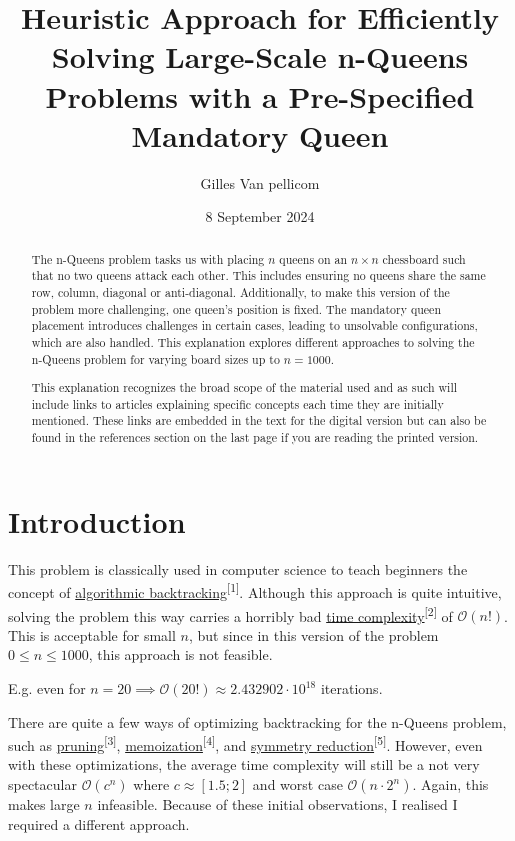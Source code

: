 \documentclass{article}
\title{Heuristic Approach for Efficiently Solving Large-Scale n-Queens Problems with a Pre-Specified Mandatory Queen}
\author{Gilles Van pellicom}
\date{8 September 2024}
\begin{document}
\maketitle

\begin{abstract}
    \setlength{\parindent}{0pt}
    \setlength{\parskip}{1em}
    The n-Queens problem tasks us with placing \(n\) queens on an \(n \times n\) chessboard such that no two queens attack each other.
    This includes ensuring no queens share the same row, column, diagonal or anti-diagonal. Additionally, to make this version of the problem more challenging,
    one queen's position is fixed.
    The mandatory queen placement introduces challenges in certain cases, leading to unsolvable configurations, which are also handled.
    This explanation explores different approaches to solving the n-Queens problem for varying board sizes up to \(n = 1000\).

    This explanation recognizes the broad scope of the material used and as such will include links to articles explaining specific concepts
    each time they are initially mentioned.
    These links are embedded in the text for the digital version but can also be found in the references section on the last page if you are reading the printed version.
\end{abstract}

\clearpage

{
    \hypersetup{linkcolor=black}
    \tableofcontents
}

\clearpage

\section{Introduction}
This problem is classically used in computer science to teach beginners the concept of
\href{https://en.wikipedia.org/wiki/Backtracking}{algorithmic backtracking}\textsuperscript{[1]}.
Although this approach is quite intuitive, solving the problem this way carries a horribly bad
\href{https://en.wikipedia.org/wiki/Time_complexity}{time complexity}\textsuperscript{[2]} of \(\mathcal{O}(n!)\).
This is acceptable for small \(n\), but since in this version of the problem \(0 \leq n \leq 1000\), this approach is not feasible.

E.g. even for \(n = 20 \implies \mathcal{O}(20!) \approx 2.432902 \cdot 10^{18}\) iterations.

There are quite a few ways of optimizing backtracking for the n-Queens problem, such as
\href{https://en.wikipedia.org/wiki/Decision_tree_pruning}{pruning}\textsuperscript{[3]},
\href{https://en.wikipedia.org/wiki/Memoization}{memoization}\textsuperscript{[4]}, and
\href{https://www.khoury.northeastern.edu/home/wahl/Publications/ew05b.pdf}{symmetry reduction}\textsuperscript{[5]}.
However, even with these optimizations, the average time complexity will still be a not very spectacular
\(\mathcal{O}(c^n)\) where \(c \approx [1.5; 2]\) and worst case \(\mathcal{O}(n \cdot 2^n)\). Again, this makes large \(n\) infeasible.
Because of these initial observations, I realised I required a different approach.
\end{document}
